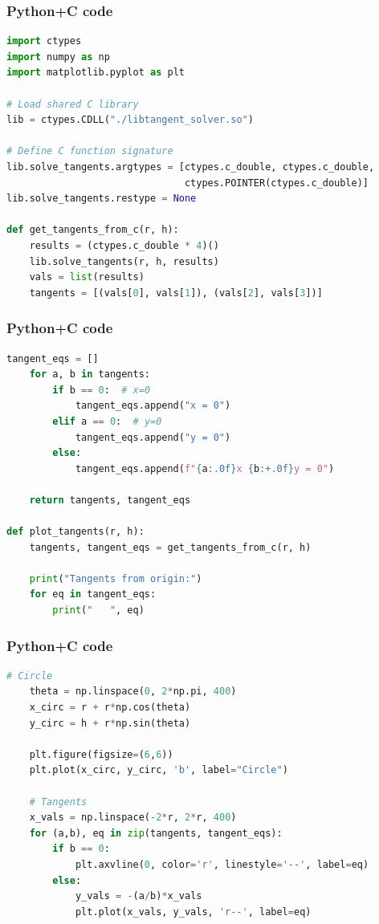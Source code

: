 \documentclass{beamer}
\begin{document}
\begin{frame}[fragile]
    \frametitle{Python+C code}

    \begin{lstlisting}[language=Python]
import ctypes
import numpy as np
import matplotlib.pyplot as plt

# Load shared C library
lib = ctypes.CDLL("./libtangent_solver.so")

# Define C function signature
lib.solve_tangents.argtypes = [ctypes.c_double, ctypes.c_double,
                               ctypes.POINTER(ctypes.c_double)]
lib.solve_tangents.restype = None

def get_tangents_from_c(r, h):
    results = (ctypes.c_double * 4)()
    lib.solve_tangents(r, h, results)
    vals = list(results)
    tangents = [(vals[0], vals[1]), (vals[2], vals[3])]
    \end{lstlisting}
\end{frame}

\begin{frame}[fragile]
    \frametitle{Python+C code}

    \begin{lstlisting}[language=Python]
 tangent_eqs = []
    for a, b in tangents:
        if b == 0:  # x=0
            tangent_eqs.append("x = 0")
        elif a == 0:  # y=0
            tangent_eqs.append("y = 0")
        else:
            tangent_eqs.append(f"{a:.0f}x {b:+.0f}y = 0")

    return tangents, tangent_eqs

def plot_tangents(r, h):
    tangents, tangent_eqs = get_tangents_from_c(r, h)

    print("Tangents from origin:")
    for eq in tangent_eqs:
        print("   ", eq)
    \end{lstlisting}
\end{frame}

\begin{frame}[fragile]
    \frametitle{Python+C code}

    \begin{lstlisting}[language=Python]
 # Circle
    theta = np.linspace(0, 2*np.pi, 400)
    x_circ = r + r*np.cos(theta)
    y_circ = h + r*np.sin(theta)

    plt.figure(figsize=(6,6))
    plt.plot(x_circ, y_circ, 'b', label="Circle")

    # Tangents
    x_vals = np.linspace(-2*r, 2*r, 400)
    for (a,b), eq in zip(tangents, tangent_eqs):
        if b == 0:
            plt.axvline(0, color='r', linestyle='--', label=eq)
        else:
            y_vals = -(a/b)*x_vals
            plt.plot(x_vals, y_vals, 'r--', label=eq)
    \end{lstlisting}
\end{frame}
\end{document}
